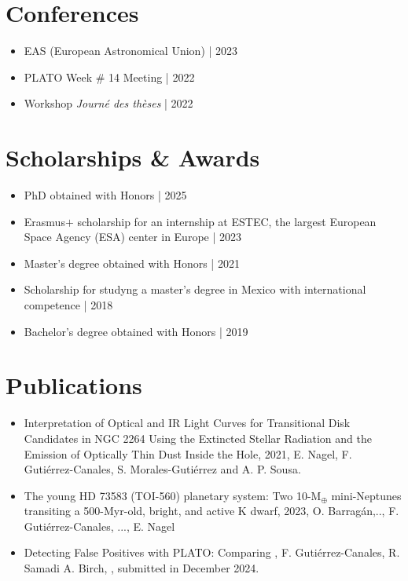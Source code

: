 \documentclass[11pt,a4paper]{article}
\begin{document}
	\section{Conferences}

		\begin{itemize}
			\item EAS (European Astronomical Union) | 2023
			\item PLATO Week \# 14 Meeting | 2022
			\item Workshop \textit{Journé des thèses} | 2022
		\end{itemize}

	
	\section{Scholarships \& Awards}
	\begin{itemize}
		\item PhD obtained with Honors | 2025
		\item Erasmus$+$ scholarship for an internship at ESTEC, the largest European Space Agency (ESA) center in Europe | 2023
		\item Master's degree obtained with Honors | 2021
		\item Scholarship for studyng a master's degree in Mexico with international competence | 2018
		\item Bachelor's degree obtained with Honors | 2019
	\end{itemize}
	
	\section{Publications}
	\begin{itemize}
		\item Interpretation of Optical and IR Light Curves for Transitional Disk Candidates in NGC 2264 Using the Extincted Stellar Radiation and the Emission of Optically Thin Dust Inside the Hole, 2021, E. Nagel, F. Gutiérrez-Canales, S. Morales-Gutiérrez and A. P. Sousa.
		\item The young HD 73583 (TOI-560) planetary system: Two 10-M$_{\oplus}$ mini-Neptunes transiting a 500-Myr-old, bright, and active K dwarf, 2023, O. Barrag\'an,.., F. Gutiérrez-Canales, ..., E. Nagel
		\item Detecting False Positives with PLATO: Comparing , F. Gutiérrez-Canales, R. Samadi A. Birch, , submitted in December 2024.
	\end{itemize}
	
\end{document}
